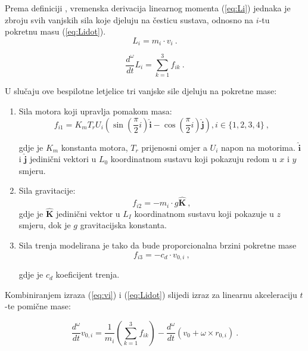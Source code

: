 \documentclass[11pt,a4paper]{article}
\begin{document}
Prema definiciji \cite{ilijic}, vremenska derivacija linearnog momenta (\ref{eq:Li}) jednaka je zbroju svih vanjskih sila koje djeluju na česticu sustava, odnosno na $i$-tu pokretnu masu (\ref{eq:Lidot}). 
\begin{equation}
 {L_{i} = m_{i} \cdot v_{i}} \ .
\label{eq:Li}
\end{equation}

\begin{equation}
 {\frac{d^{\omega}}{dt} L_{i} = \sum_{k=1}^{3}f_{ik}} \ .
\label{eq:Lidot}
\end{equation}

U slučaju ove bespilotne letjelice tri vanjske sile djeluju na pokretne mase:

\begin{enumerate}
 \item Sila motora koji upravlja pomakom masa:
\begin{equation}
f_{i1}  =K_{m}T_{r}U_{i}\left(\sin\left(\frac{\pi}{2}i\right) \bm{\hat{i}} - \cos\left( \frac{\pi}{2}i\right) \bm{\hat{j}}\right), i \in \{1,2,3,4\} \ ,
\label{eq:fi1}
\end{equation}

gdje je $K_{m}$ konstanta motora, $T_{r}$ prijenosni omjer a $U_{i}$ napon na motorima.  $\bm{\hat{i}}$ i  $\bm{\hat{j}}$ jedinični vektori u $L_{0}$ koordinatnom sustavu koji pokazuju redom u $x$ i $y$ smjeru.

\item Sila gravitacije:
\begin{equation}
f_{i2} = -m_{i}\cdot g \bm{\hat{K}} \ ,
\label{eq:fi2}
\end{equation}
gdje je  $\bm{\hat{K}}$ jedinični vektor u $L_{I}$ koordinatnom sustavu koji pokazuje u $z$ smjeru, dok je $g$ gravitacijska konstanta. 

\item Sila trenja modelirana je tako da bude proporcionalna brzini pokretne mase
\begin{equation}
f_{i3} = -c_{d} \cdot v_{0,i} \ ,
\label{eq:fi3}
\end{equation}

gdje je $c_{d}$ koeficijent trenja.

\end{enumerate}

Kombiniranjem izraza (\ref{eq:vi}) i (\ref{eq:Lidot}) slijedi izraz za linearnu akceleraciju $t$-te pomične mase:

\begin{equation}
\frac{d^{\omega}}{dt}v_{0,i} = \frac{1}{m_{i}}\left(\sum_{k=1}^{3}f_{ik}\right) - \frac{d^{\omega}}{dt} \left( v_{0} + \omega \times r_{0,i} \right)  \ .
\label{eq:voidot}
\end{equation}
\end{document}
